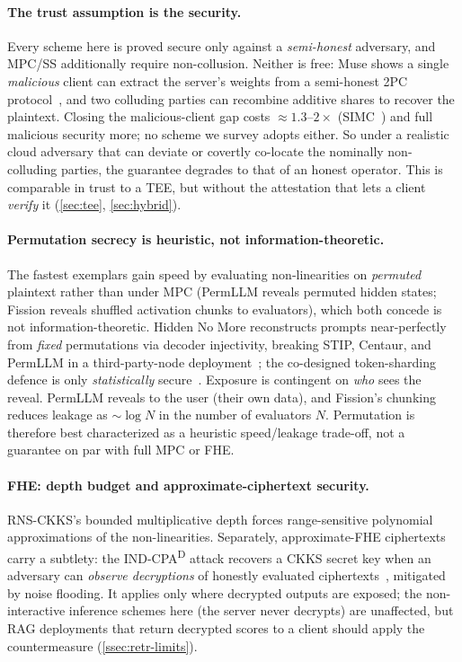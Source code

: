 \paragraph{The trust assumption is the security.}
Every scheme here is proved secure only against a \emph{semi-honest} adversary, and MPC/SS
additionally require non-collusion. Neither is free: Muse shows a single \emph{malicious} client can
extract the server's weights from a semi-honest 2PC protocol~\citep{muse_2021}, and two colluding
parties can recombine additive shares to recover the plaintext. Closing the malicious-client gap
costs ${\approx}1.3$--$2\times$ (SIMC~\citep{simc_2022}) and full malicious security more; no scheme
we survey adopts either. So under a realistic cloud adversary that can deviate or covertly co-locate
the nominally non-colluding parties, the guarantee degrades to that of an honest operator. This is
comparable in trust to a TEE, but without the attestation that lets a client \emph{verify} it
(\cref{sec:tee}, \cref{sec:hybrid}).

\paragraph{Permutation secrecy is heuristic, not information-theoretic.}
The fastest exemplars gain speed by evaluating non-linearities on \emph{permuted} plaintext rather
than under MPC (PermLLM reveals permuted hidden states; Fission reveals shuffled activation chunks
to evaluators), which both concede is not information-theoretic. Hidden No More reconstructs prompts
near-perfectly from \emph{fixed} permutations via decoder injectivity, breaking STIP, Centaur, and
PermLLM in a third-party-node deployment~\citep{hnm}; the co-designed token-sharding defence is only
\emph{statistically} secure~\citep{cascade_thomas}. Exposure is contingent on \emph{who} sees the
reveal. PermLLM reveals to the user (their own data), and Fission's chunking reduces leakage as
${\sim}\log N$ in the number of evaluators $N$. Permutation is therefore best characterized as a
heuristic speed/leakage trade-off, not a guarantee on par with full MPC or FHE.

\paragraph{FHE: depth budget and approximate-ciphertext security.}
RNS-CKKS's bounded multiplicative depth forces range-sensitive polynomial approximations of the
non-linearities. Separately, approximate-FHE ciphertexts carry a subtlety: the
IND-CPA\textsuperscript{D} attack recovers a CKKS secret key when an adversary can \emph{observe
decryptions} of honestly evaluated ciphertexts~\citep{li_micciancio_2021}, mitigated by noise
flooding. It applies only where decrypted outputs are exposed; the non-interactive inference schemes
here (the server never decrypts) are unaffected, but RAG deployments that return decrypted scores to
a client should apply the countermeasure (\cref{ssec:retr-limits}).